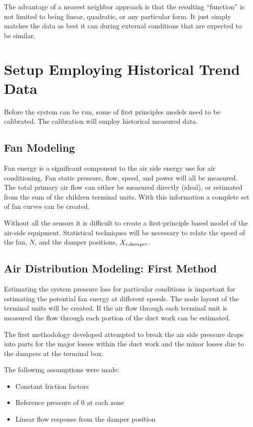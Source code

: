 The advantage of a nearest neighbor approach is that the resulting ``function'' is not limited to being linear, quadratic, or any particular form. It just simply matches the data as best it can during external conditions that are expected to be similar.

\section{Setup Employing Historical Trend Data}

Before the system can be run, some of first principles models need to be calibrated. The calibration will employ historical measured data.

\subsection{Fan Modeling}\label{sec:FanModeling}

Fan energy is a significant component to the air side energy use for air conditioning. Fan static pressure, flow, speed, and power will all be measured. The total primary air flow can either be measured directly (ideal), or estimated from the sum of the children terminal units. With this information a complete set of fan curves can be created. 

Without all the sensors it is difficult to create a first-principle based model of the air-side equipment. Statistical techniques will be necessary to relate the speed of the fan, \(\dot N\), and the damper positions, \(X_{i,damper}\). 

\subsection{Air Distribution Modeling: First Method}

Estimating the system pressure loss for particular conditions is important for estimating the potential fan energy at different speeds. The node layout of the terminal units will be created. If the air flow through each terminal unit is measured the flow through each portion of the duct work can be estimated. 

The first methodology developed attempted to break the air side pressure drops into parts for the major losses within the duct work and the minor losses due to the dampers at the terminal box. 

The following assumptions were made:

\begin{itemize}
    \item Constant friction factors
    \item Reference pressure of 0 at each zone
    \item Linear flow response from the damper position
\end{itemize}

